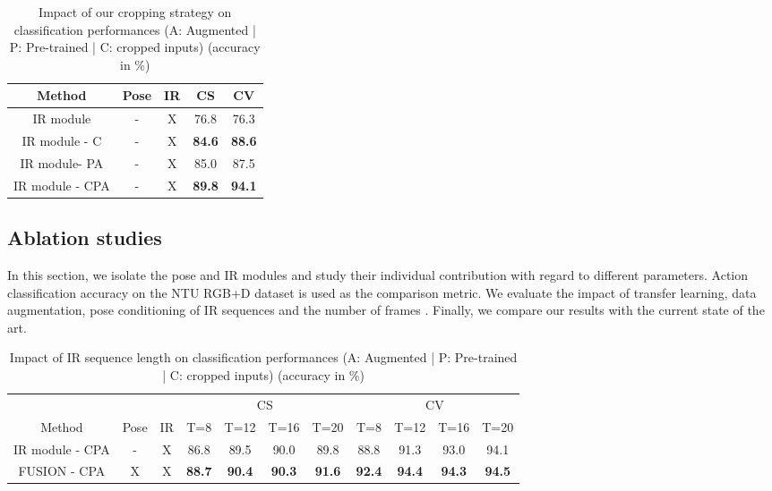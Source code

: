 \documentclass[letterpaper, 10 pt, conference]{ieeeconf}
\begin{document}
\begin{table}[t]
\caption{Impact of our cropping strategy on classification performances (A: Augmented | P: Pre-trained | C: cropped inputs) (accuracy in \%)}
\label{cropping_results}
\begin{center}
\begin{tabular}{ccccc}
Method & Pose & IR & CS & CV \\
\hline \hline
IR module & - & X & 76.8 & 76.3 \\
IR module - C & - & X & \textbf{84.6} & \textbf{88.6} \\
 \hline
IR module- PA & - & X & 85.0 & 87.5 \\
IR module - CPA & - & X & \textbf{89.8} & \textbf{94.1} \\ 
\end{tabular}
\end{center}
\end{table}

\subsection{Ablation studies}

In this section, we isolate the pose and IR modules and study their individual contribution with regard to different parameters. Action classification accuracy on the NTU RGB+D dataset is used as the comparison metric. We evaluate the impact of transfer learning, data augmentation, pose conditioning of IR sequences and the number of frames . Finally, we compare our results with the current state of the art.

\begin{table*}[t]
\caption{Impact of IR sequence length on classification performances (A: Augmented | P: Pre-trained | C: cropped inputs) (accuracy in \%)}
\label{seq_len_results}
\begin{center}
\begin{tabular}{ccc|cccc|cccc}
& & & \multicolumn{4}{c|}{ CS} & \multicolumn{4}{c}{ CV } \\
\cline{4-11}
Method & Pose & IR & T=8 & T=12 & T=16 & T=20 & T=8 & T=12 & T=16 & T=20 \\ 
\hline \hline
IR module - CPA & - & X & 86.8 & 89.5 & 90.0 & 89.8 & 88.8 & 91.3 & 93.0 & 94.1 \\
FUSION - CPA & X & X & \textbf{88.7} & \textbf{90.4} & \textbf{90.3} & \textbf{91.6} & \textbf{92.4} & \textbf{94.4} & \textbf{94.3} & \textbf{94.5} \\ 
\end{tabular} 
\end{center}
\end{table*}
\end{document}
